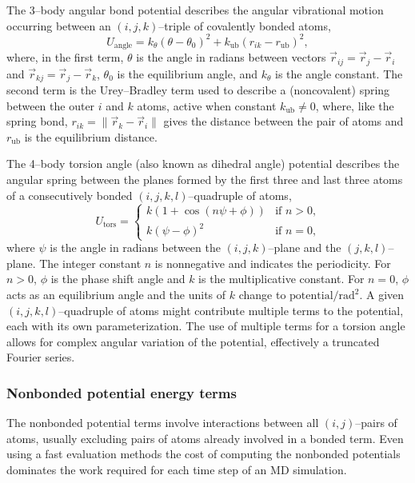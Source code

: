 The 3--body angular bond potential
describes the angular vibrational motion
occurring between an $(i,j,k)$--triple of covalently bonded atoms,
\begin{equation}
U_{\text{angle}} = k_{\theta} (\theta - \theta_0)^2
                 + k_{\text{ub}} (r_{ik} - r_{\text{ub}})^2,
\end{equation}
where, in the first term,
$\theta$ is the angle in radians between vectors
$\vec{r}_{ij} = \vec{r}_j - \vec{r}_i$
and $\vec{r}_{kj} = \vec{r}_j - \vec{r}_k$,
$\theta_0$ is the equilibrium angle,
and $k_{\theta}$ is the angle constant.
The second term is the Urey--Bradley term
used to describe a 
(noncovalent) spring between the outer $i$ and $k$ atoms,
active when constant $k_{\text{ub}} \neq 0$,
where, like the spring bond,
$r_{ik} = \|\vec{r}_k - \vec{r}_i\|$ gives the distance between
the pair of atoms and
$r_{\text{ub}}$ is the equilibrium distance.

The 4--body torsion angle (also known as dihedral angle) potential
describes the angular spring between the planes formed
by the first three and last three atoms of
a consecutively bonded $(i,j,k,l)$--quadruple of atoms,
\begin{equation}
U_{\text{tors}} =
  \begin{cases}
  k (1 + \cos(n \psi + \phi)) & \text{if $n > 0$,} \\
  k (\psi - \phi)^2           & \text{if $n = 0$,}
  \end{cases}
\end{equation}
where $\psi$ is the angle in radians between
the $(i,j,k)$--plane and the $(j,k,l)$--plane.
The integer constant $n$ is nonnegative and indicates the periodicity.
For $n > 0$, $\phi$ is the phase shift angle
and $k$ is the multiplicative constant.
For $n = 0$, $\phi$ acts as an equilibrium angle
and the units of $k$ change to $\text{potential}/\text{rad}^2$.
A given $(i,j,k,l)$--quadruple of atoms might contribute
multiple terms to the potential,
each with its own parameterization.
The use of multiple terms for a torsion angle allows for
complex angular variation of the potential,
effectively a truncated Fourier series.


\subsubsection{Nonbonded potential energy terms}

The nonbonded potential terms involve interactions
between all $(i,j)$--pairs of atoms,
usually excluding pairs of atoms already involved in a bonded term.
Even using a fast evaluation methods
the cost of computing the nonbonded potentials dominates the work
required for each time step of an MD simulation.


